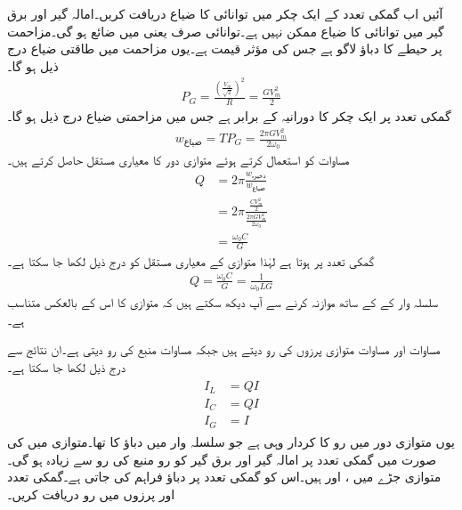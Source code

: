 آئیں اب گمکی تعدد کے ایک چکر میں توانائی کا ضیاع دریافت کریں۔امالہ گیر اور برق گیر میں توانائی کا ضیاع ممکن نہیں ہے۔توانائی صرف  یعنی  میں ضائع ہو گی۔مزاحمت پر  حیطے کا دباؤ لاگو ہے جس کی مؤثر قیمت  ہے۔یوں مزاحمت میں طاقتی ضیاع درج ذیل ہو گا۔
\begin{align*}
P_G=\frac{\left(\frac{V_m}{\sqrt{2}}\right)^2}{R}=\frac{GV_m^2}{2}
\end{align*}
گمکی تعدد پر ایک چکر کا دورانیہ  کے برابر ہے جس میں مزاحمتی ضیاع درج ذیل ہو گا۔
\begin{align}
w_{\text{ضیاع}}=T P_G=\frac{2\pi GV_m^2}{2\omega_0}
\end{align}
مساوات  کو استعمال کرتے ہوئے متوازی  دور کا معیاری مستقل حاصل کرتے ہیں۔
\begin{align*}
Q&=2\pi \frac{w_{\text{ذخیرہ}}}{w_{\text{ضیاع}}}\\
&=2\pi \frac{\frac{CV_m^2}{2}}{\frac{2\pi GV_m^2}{2\omega_0}}\\
&=\frac{\omega_0 C}{G}
\end{align*}
گمکی تعدد پر  ہوتا ہے لہٰذا  متوازی  کے معیاری مستقل کو درج ذیل لکھا جا سکتا ہے۔
\begin{align}
Q=\frac{\omega_0 C}{G}=\frac{1}{\omega_0 L G}
\end{align}
سلسلہ وار  کے  کے ساتھ موازنہ کرنے سے آپ دیکھ سکتے ہیں کہ متوازی  کا  اس کے بالعکس متناسب ہے۔

مساوات  اور مساوات  متوازی پرزوں کی رو دیتے ہیں جبکہ مساوات  منبع کی رو دیتی ہے۔ان نتائج سے درج ذیل لکھا جا سکتا ہے۔
\begin{gather}
\begin{aligned}
I_L&=Q I\\
I_C&=Q I\\
I_G&=I
\end{aligned}
\end{gather}
یوں متوازی  دور میں رو کا کردار وہی ہے جو سلسلہ وار  میں دباؤ کا تھا۔متوازی  میں  کی صورت میں گمکی تعدد پر امالہ گیر اور برق گیر کو رو منبع کی رو سے زیادہ ہو گی۔ 
متوازی جڑے  میں ،  اور  ہیں۔اس کو گمکی تعدد پر  دباؤ فراہم کی جاتی ہے۔گمکی تعدد اور پرزوں میں رو دریافت کریں۔ 

